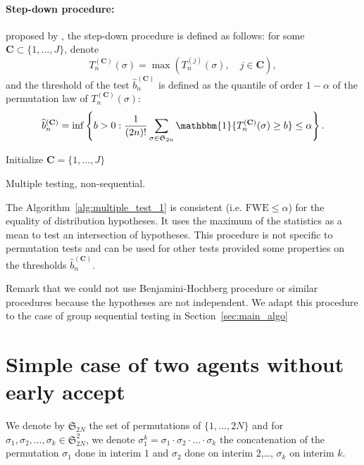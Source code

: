 \documentclass{article}
\theoremstyle{plain}
\theoremstyle{remark}
\renewcommand{\S}{\mathfrak{S}}
\newcommand{\1}{\mathbbm{1}}
\numberwithin{equation}{section}
\begin{document}
\paragraph{Step-down procedure:} proposed by \cite{Romano_2003}, the step-down procedure is defined as follows: for some $\textbf{C} \subset \{1,\dots,J\}$, denote
$$T_{n}^{(\textbf{C})}(\sigma)= \max\left(T_n^{(j)}(\sigma),\quad j \in \textbf{C}\right),$$
and the threshold of the test $\widehat{b}_{n}^{(\textbf{C})}$ is defined as the quantile of order $1-\alpha$ of the permutation law of $T_{n}^{(\textbf{C})}(\sigma)$:
\begin{equation}\label{eq:threshold_multi} 
\widehat{b}_{n}^{(\textbf{C})} = \inf\left\{b>0: \frac{1}{(2n)!} \sum_{\sigma \in \S_{2n}} \1\{T_{n}^{(\textbf{C})}(\sigma) \ge b\} \le   \alpha  \right\}.
\end{equation}
\begin{algorithm}[h]
\SetAlgoLined
{}
Initialize $\textbf{C}=\{1,\dots,J\}$\\
\caption{Multiple testing, non-sequential.}\label{alg:multiple_test_1}
\end{algorithm}
The Algorithm~\ref{alg:multiple_test_1} is consistent (i.e. $\mathrm{FWE}\le \alpha$) for the equality of distribution hypotheses. It uses the maximum of the statistics as a mean to test an intersection of hypotheses. This procedure is not specific to permutation tests and can be used for other tests provided some properties on the thresholds $\widehat{b}_{n}^{(\textbf{C})}$. 

Remark that we could not use Benjamini-Hochberg procedure or similar procedures because the hypotheses are not independent. We adapt this procedure to the case of group sequential testing in Section~\ref{sec:main_algo}

\section{Simple case of two agents without early accept}
We denote by $\S_{2N}$ the set of permutations of $\{1,\dots,2N\}$ and for $\sigma_1,\sigma_2,\dots,\sigma_k \in \S_{2N}^2$, we denote $\sigma_1^k=\sigma_1 \cdot \sigma_2 \cdot \ldots \cdot \sigma_k$ the concatenation of the permutation $\sigma_1$ done in interim $1$ and $\sigma_2$ done on interim $2$,\dots, $\sigma_k$ on interim $k$.
\end{document}
